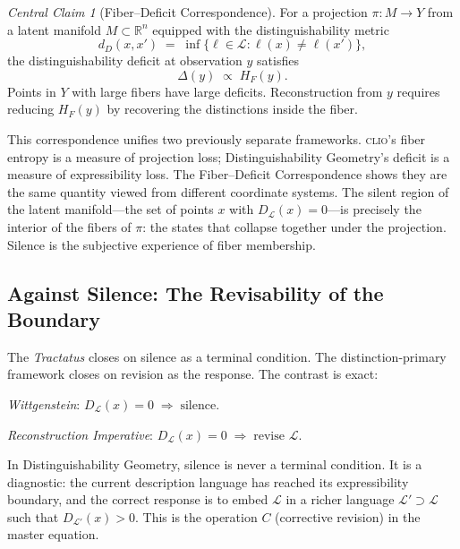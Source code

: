\documentclass[12pt, letterpaper]{article}
\theoremstyle{remark}
\newtheorem*{claim}{Central Claim}
\newcommand{\clio}{\textsc{clio}}
\begin{document}
\begin{claim}[Fiber--Deficit Correspondence]
For a projection $\pi: M \to Y$ from a latent manifold $M \subset
\mathbb{R}^n$ equipped with the distinguishability metric
\[
  d_D(x,x') \;=\; \inf\{\ell \in \mathcal{L} : \ell(x) \neq \ell(x')\},
\]
the distinguishability deficit at observation $y$ satisfies
\[
  \Delta(y) \;\propto\; H_F(y).
\]
Points in $Y$ with large fibers have large deficits.  Reconstruction from
$y$ requires reducing $H_F(y)$ by recovering the distinctions inside the
fiber.
\end{claim}

This correspondence unifies two previously separate frameworks.  \clio{}'s
fiber entropy is a measure of projection loss; Distinguishability Geometry's
deficit is a measure of expressibility loss.  The Fiber--Deficit
Correspondence shows they are the same quantity viewed from different
coordinate systems.  The silent region of the latent manifold---the set
of points $x$ with $D_{\mathcal{L}}(x) = 0$---is precisely the interior
of the fibers of $\pi$: the states that collapse together under the
projection.  Silence is the subjective experience of fiber membership.

\subsection{Against Silence: The Revisability of the Boundary}

The \textit{Tractatus} closes on silence as a terminal condition.
The distinction-primary framework closes on revision as the response.
The contrast is exact:

\medskip
\noindent
\textit{Wittgenstein}: \quad $D_{\mathcal{L}}(x) = 0 \;\Rightarrow\;
\text{silence}.$

\medskip
\noindent
\textit{Reconstruction Imperative}: \quad $D_{\mathcal{L}}(x) = 0
\;\Rightarrow\; \text{revise } \mathcal{L}.$

\medskip
In Distinguishability Geometry, silence is never a terminal condition.
It is a diagnostic: the current description language has reached its
expressibility boundary, and the correct response is to embed
$\mathcal{L}$ in a richer language $\mathcal{L}' \supset \mathcal{L}$
such that $D_{\mathcal{L}'}(x) > 0$.  This is the operation $C$
(corrective revision) in the master equation.
\end{document}
